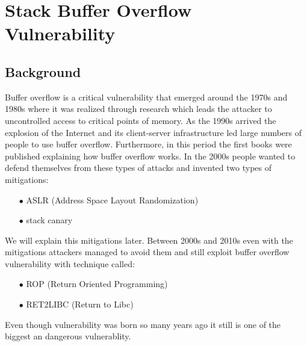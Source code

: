 \chapter{Stack Buffer Overflow Vulnerability}
    \section{Background} 
    Buffer overflow is a critical vulnerability that emerged around the 1970s and 1980s where it was 
    realized through research which leads the attacker to uncontrolled access to critical points of memory.\newline
    As the 1990s arrived the explosion of the Internet and its client-server infrastructure led large numbers of people to use buffer overflow.\newline
    Furthermore, in this period the first books were published explaining how buffer overflow works.\newline
    In the 2000s people wanted to defend themselves from these types of attacks and invented two types of mitigations:\newline
    \begin{itemize}
        \item[$\bullet$] ASLR (Address Space Layout Randomization)
        \item[$\bullet$] stack canary 
    \end{itemize}
    We will explain this mitigations later.\newline
    Between 2000s and 2010s even with the mitigations attackers managed to avoid them and still exploit buffer overflow vulnerability with technique called:\newline
        \begin{itemize}
        \item[$\bullet$] ROP (Return Oriented Programming)
        \item[$\bullet$] RET2LIBC (Return to Libc)
    \end{itemize}
    Even though vulnerability was born so many years ago it still is one of the biggest an dangerous vulnerablity.
    \clearpage
  
